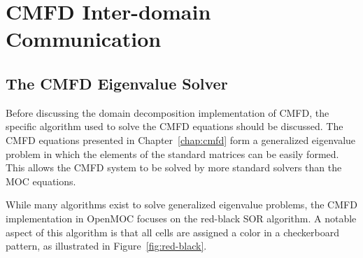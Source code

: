 \section{CMFD Inter-domain Communication}
\label{sec:cmfd-dd}

\subsection{The CMFD Eigenvalue Solver}

Before discussing the domain decomposition implementation of \ac{CMFD}, the specific algorithm used to solve the \ac{CMFD} equations should be discussed. The \ac{CMFD} equations presented in Chapter~\ref{chap:cmfd} form a generalized eigenvalue problem in which the elements of the standard matrices can be easily formed. This allows the \ac{CMFD} system to be solved by more standard solvers than the \ac{MOC} equations.

While many algorithms exist to solve generalized eigenvalue problems, the \ac{CMFD} implementation in OpenMOC focuses on the red-black SOR algorithm. A notable aspect of this algorithm is that all cells are assigned a color in a checkerboard pattern, as illustrated in Figure~\ref{fig:red-black}. 

